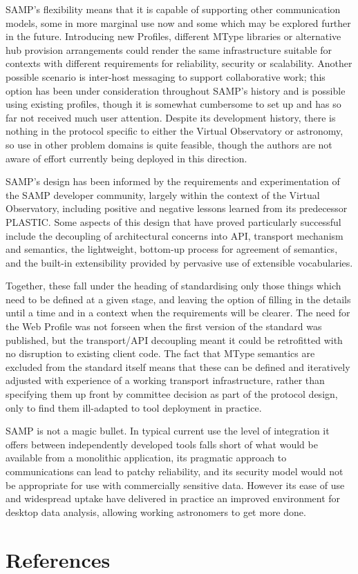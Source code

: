 \documentclass[5p]{elsarticle}
\begin{document}
SAMP's flexibility means that it is capable of supporting other
communication models, some in more marginal use now
and some which may be explored further in the future.
Introducing new Profiles, different MType libraries or
alternative hub provision arrangements could render the same
infrastructure suitable for contexts with different
requirements for reliability, security or scalability.
Another possible scenario is inter-host messaging to
support collaborative work;
this option has been under consideration throughout SAMP's history
and is possible using existing profiles,
though it is somewhat cumbersome to set up and has so far not
received much user attention.
Despite its development history, there is nothing in the protocol
specific to either the Virtual Observatory or astronomy,
so use in other problem domains is quite feasible,
though the authors are not aware of effort currently being
deployed in this direction.

SAMP's design has been informed by the requirements and experimentation
of the SAMP developer community, largely within the context of
the Virtual Observatory,
including positive and negative lessons learned from its predecessor PLASTIC.
Some aspects of this design that have proved particularly successful
include
the decoupling of architectural concerns into API, transport
mechanism and semantics,
the lightweight, bottom-up process for agreement of semantics,
and the built-in extensibility provided by pervasive use of
extensible vocabularies.

Together, these fall under the heading of standardising
only those things which need to be defined at a given stage,
and leaving the option of filling in the details until a time
and in a context when the requirements will be clearer.
The need for the Web Profile was not forseen when the first version
of the standard was published, but the transport/API decoupling
meant it could be retrofitted with no disruption to existing client code.
The fact that MType semantics are excluded from the standard
itself means that these can be defined and iteratively adjusted with
experience of a working transport infrastructure, rather than
specifying them up front by committee decision as part of the
protocol design, only to find them ill-adapted to tool
deployment in practice.

SAMP is not a magic bullet.
In typical current use the level of integration it offers
between independently developed tools falls short of what would be
available from a monolithic application,
its pragmatic approach to communications can lead to patchy reliability,
and its security model would not be appropriate for use with
commercially sensitive data.
However its ease of use and widespread uptake have delivered in practice
an improved environment for desktop data analysis,
allowing working astronomers to get more done.



\section*{References}


\end{document}
